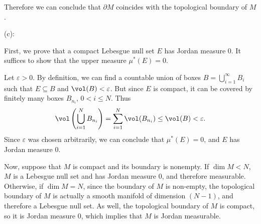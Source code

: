 \documentclass{../../../tex-setup/eh-homework}
\begin{document}
\begin{question}{42}
        \smallskip

        Therefore we can conclude that \(\partial M\) coincides with the topological boundary of \(M\).

        \medskip

        (c):

        First, we prove that a compact Lebesgue null set \(E\) has Jordan measure 0. It suffices to show that the upper measure \(\mu ^* (E) = 0\).

        Let \(\varepsilon > 0\). By definition, we can find a countable union of boxes \(B = \bigcup_{i=1}^{\infty} B_i\) such that \(E \subseteq B\) and \(\vol(B) < \varepsilon\). But since \(E\) is compact, it can be covered by finitely many boxes \(B_{n_i}\), \(0 < i \leq N\). Thus
        \[
            \vol\left( \bigcup_{i=1}^{N} B_{n_i} \right) = \sum_{i=1}^{N} \vol(B_{n_i}) \leq \vol(B) < \varepsilon.
        \]
        Since \(\varepsilon\) was chosen arbitrarily, we can conclude that \(\mu ^* (E) = 0\), and \(E\) has Jordan measure 0.

        Now, suppose that \(M\) is compact and its boundary is nonempty. If \(\dim M < N\), \(M\) is a Lebesgue null set and has Jordan measure 0, and therefore measurable. Otherwise, if \(\dim M = N\), since the boundary of \(M\) is non-empty, the topological boundary of \(M\) is actually a smooth manifold of dimension \((N-1)\), and therefore a Lebesgue null set. As well, the topological boundary of \(M\) is compact, so it is Jordan measure 0, which implies that \(M\) is Jordan measurable.
    \end{question}
    \newpage
\end{document}
